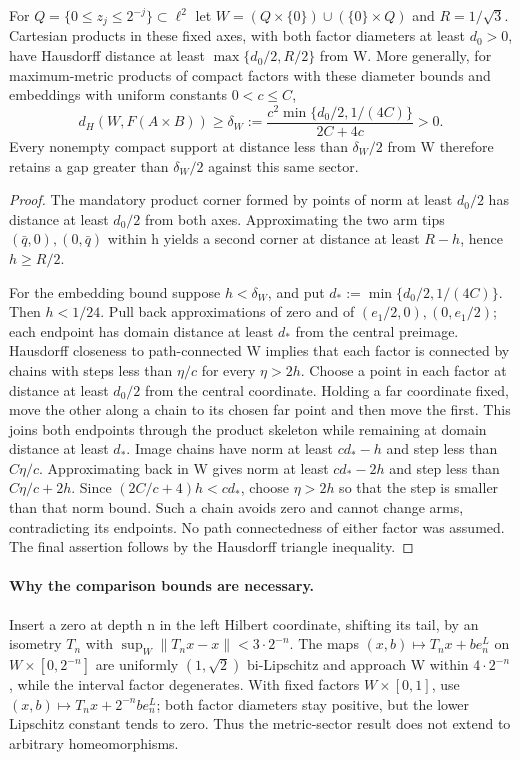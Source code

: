 \begin{proposition}
\label{prop:base-wedge-metric-sector}
For $Q=\{0\le z_j\le2^{-j}\}\subset\ell^2$ let
$W=(Q\times\{0\})\cup(\{0\}\times Q)$ and $R=1/\sqrt3$.
Cartesian products in these fixed axes, with both factor diameters at least
$d_0>0$, have Hausdorff distance at least $\max\{d_0/2,R/2\}$ from W.
More generally, for maximum-metric products of compact factors with these
diameter bounds and embeddings with uniform constants $0<c\le C$,
\[
 d_H(W,F(A\times B))\ge
 \delta_W:=\frac{c^2\min\{d_0/2,1/(4C)\}}{2C+4c}>0.
\]
Every nonempty compact support at distance less than $\delta_W/2$ from W
therefore retains a gap greater than $\delta_W/2$ against this same sector.
\end{proposition}
\begin{proof}
The mandatory product corner formed by points of norm at least $d_0/2$ has
distance at least $d_0/2$ from both axes. Approximating the two arm tips
$(\bar q,0),(0,\bar q)$ within h yields a second corner at distance at least
$R-h$, hence $h\ge R/2$.

For the embedding bound suppose $h<\delta_W$, and put
$d_*:=\min\{d_0/2,1/(4C)\}$. Then $h<1/24$. Pull back approximations of zero
and of $(e_1/2,0),(0,e_1/2)$; each endpoint has domain distance at least $d_*$
from the central preimage. Hausdorff closeness to path-connected W implies
that each factor is connected by chains with steps less than $\eta/c$ for
every $\eta>2h$. Choose a point in each factor at distance at least $d_0/2$
from the central coordinate. Holding a far coordinate fixed, move the other
along a chain to its chosen far point and then move the first. This joins
both endpoints through the product skeleton while remaining at domain
distance at least $d_*$. Image chains have norm at least $cd_*-h$ and step
less than $C\eta/c$. Approximating back in W gives norm at least $cd_*-2h$
and step less than $C\eta/c+2h$. Since $(2C/c+4)h<cd_*$, choose $\eta>2h$
so that the step is smaller than that norm bound. Such a chain avoids zero
and cannot change arms, contradicting its endpoints. No path connectedness
of either factor was assumed. The final assertion follows by the Hausdorff
triangle inequality.
\end{proof}

\paragraph{Why the comparison bounds are necessary.}
Insert a zero at depth n in the left Hilbert coordinate, shifting its tail,
by an isometry $T_n$ with $\sup_W\|T_nx-x\|<3\cdot2^{-n}$. The maps
$(x,b)\mapsto T_nx+be_n^L$ on $W\times[0,2^{-n}]$ are uniformly
$(1,\sqrt2)$ bi-Lipschitz and approach W within $4\cdot2^{-n}$, while the
interval factor degenerates. With fixed factors $W\times[0,1]$, use
$(x,b)\mapsto T_nx+2^{-n}be_n^L$; both factor diameters stay positive, but
the lower Lipschitz constant tends to zero. Thus the metric-sector result
does not extend to arbitrary homeomorphisms.

